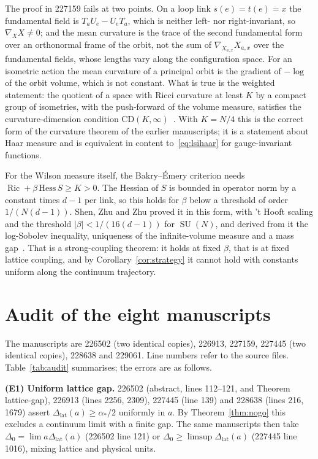 \documentclass[aps,prd,twocolumn,superscriptaddress,nofootinbib,floatfix]{revtex4-2}
\theoremstyle{definition}
\theoremstyle{remark}
\DeclareMathOperator{\SU}{SU}
\DeclareMathOperator{\Ric}{Ric}
\newcommand{\Dlat}{\Delta_{\mathrm{lat}}}
\begin{document}
The proof in 227159 fails at two points. On a loop link $s(e)=t(e)=x$ the
fundamental field is $T_aU_e-U_eT_a$, which is neither left- nor
right-invariant, so $\nabla_XX\ne0$; and the mean curvature is the trace of
the second fundamental form over an orthonormal frame of the orbit, not the
sum of $\nabla_{X_{a,x}}X_{a,x}$ over the fundamental fields, whose lengths
vary along the configuration space. For an isometric action the mean
curvature of a principal orbit is the gradient of $-\log$ of the orbit
volume, which is not constant. What is true is the weighted statement: the
quotient of a space with Ricci curvature at least $K$ by a compact group
of isometries, with the push-forward of the volume measure, satisfies the
curvature-dimension condition $\mathrm{CD}(K,\infty)$~\cite{Lot03,GKMS18}.
With $K=N/4$ this is the correct form of the curvature theorem of the
earlier manuscripts; it is a statement about Haar measure and is equivalent
in content to~\eqref{eq:lsihaar} for gauge-invariant functions.

For the Wilson measure itself, the Bakry--\'Emery criterion needs
$\Ric+\beta\,\mathrm{Hess}\,S\ge K>0$. The Hessian of $S$ is bounded in
operator norm by a constant times $d-1$ per link, so this holds for
$\beta$ below a threshold of order $1/(N(d-1))$. Shen, Zhu and Zhu proved
it in this form, with 't Hooft scaling and the threshold
$|\beta|<1/(16(d-1))$ for $\SU(N)$, and derived from it the log-Sobolev
inequality, uniqueness of the infinite-volume measure and a mass
gap~\cite{SZZ23}. That is a strong-coupling theorem: it holds at fixed
$\beta$, that is at fixed lattice coupling, and by
Corollary~\ref{cor:strategy} it cannot hold with constants uniform along
the continuum trajectory.

\section{Audit of the eight manuscripts}
\label{sec:audit}

The manuscripts are 226502 (two identical copies), 226913, 227159, 227445
(two identical copies), 228638 and 229061. Line numbers refer to the source
files. Table~\ref{tab:audit} summarises; the errors are as follows.

\textbf{(E1) Uniform lattice gap.} 226502 (abstract, lines 112--121, and
Theorem lattice-gap), 226913 (lines 2256, 2309), 227445 (line 139) and
228638 (lines 216, 1679) assert $\Dlat(a)\ge\alpha_*/2$ uniformly in $a$.
By Theorem~\ref{thm:nogo} this excludes a continuum limit with a finite
gap. The same manuscripts then take $\Delta_0=\lim a\Dlat(a)$ (226502 line
121) or $\Delta_0\ge\limsup\Dlat(a)$ (227445 line 1016), mixing lattice and
physical units.
\end{document}
